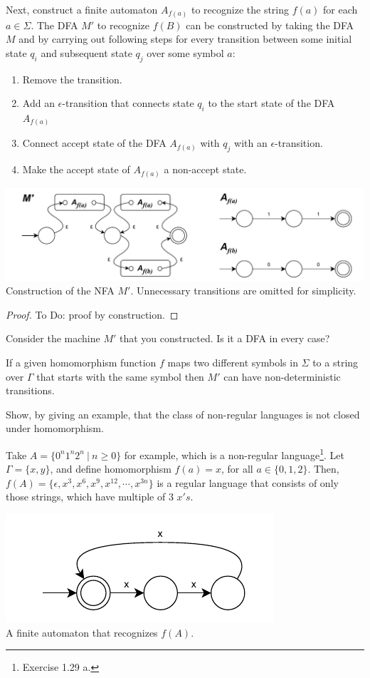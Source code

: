 \documentclass[11pt]{article}
\newenvironment{problem}[2][Problem]{\begin{trivlist}
\item[\hskip \labelsep {\bfseries #1}\hskip \labelsep {\bfseries #2.}]}{\end{trivlist}}
\begin{document}
Next, construct a finite automaton $A_{f(a)}$ to recognize the string $f(a)$ for each $a \in \Sigma$. The DFA $M'$ to recognize $f(B)$ can be constructed by taking the DFA $M$ and by carrying out following steps for every transition between some initial state $q_{i}$ and subsequent state $q_{j}$ over some symbol $a$:
\begin{enumerate}
\item Remove the transition.
\item Add an $\epsilon$-transition that connects state $q_{i}$ to the start state of the DFA $A_{f(a)}$
\item Connect accept state of the DFA $A_{f(a)}$ with $q_{j}$ with an $\epsilon$-transition.
\item Make the accept state of $A_{f(a)}$ a non-accept state.
\end{enumerate}

\begin{center}
\includegraphics[scale=0.8]{Figures/Problem1.66b.pdf} \\
Construction of the NFA $M'$. Unnecessary transitions are omitted for simplicity.
\end{center}

\begin{proof}
To Do: proof by construction.
\end{proof}

Consider the machine $M'$ that you constructed. Is it a DFA in every case?

If a given homomorphism function $f$ maps two different symbols in $\Sigma$ to a string over $\Gamma$ that starts with the same symbol then $M'$ can have non-deterministic transitions.

\begin{problem}[Part]{b}
Show, by giving an example, that the class of non-regular languages is not
closed under homomorphism.
\end{problem}

Take $A = \{0^{n}1^{n}2^{n} \ | \ n \geq 0 \}$ for example, which is a non-regular language\footnote{Exercise 1.29 a.}. Let $\Gamma = \{x, y\}$, and define homomorphism $f(a) = x$, for all $a \in \{0, 1, 2\}$. Then, $f(A) = \{ \epsilon, x^{3}, x^{6}, x^{9}, x^{12}, \cdots, x^{3n}\}$ is a regular language that consists of only those strings, which have multiple of 3 $x's$.

\begin{center}
\includegraphics[scale=1.0]{Figures/Problem1.66c.pdf} \\
A finite automaton that recognizes $f(A)$.
\end{center}
\end{document}
